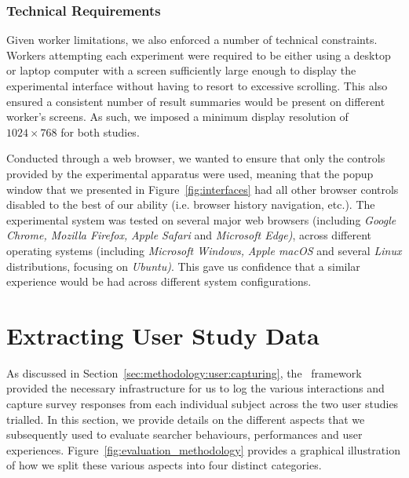 \subsubsection{Technical Requirements}\label{sec:methodology:user:crowdsourcing:technical}
Given worker limitations, we also enforced a number of technical constraints. Workers attempting each experiment were required to be either using a desktop or laptop computer with a screen sufficiently large enough to display the experimental interface without having to resort to excessive scrolling. This also ensured a consistent number of result summaries would be present on different worker's screens. As such, we imposed a minimum display resolution of $1024 \times 768$ for both studies. 

Conducted through a web browser, we wanted to ensure that only the controls provided by the experimental apparatus were used, meaning that the popup window that we presented in Figure~\ref{fig:interfaces} had all other browser controls disabled to the best of our ability (i.e. browser history navigation, etc.). The experimental system was tested on several major web browsers (including \emph{Google Chrome, Mozilla Firefox,} \emph{Apple Safari} and \emph{Microsoft Edge)}, across different operating systems (including \emph{Microsoft Windows,} \emph{Apple macOS} and several \emph{Linux} distributions, focusing on \emph{Ubuntu)}. This gave us confidence that a similar experience would be had across different system configurations.

\section{Extracting User Study Data}\label{sec:methodology:extracting}
As discussed in Section~\ref{sec:methodology:user:capturing}, the \treconomics~framework provided the necessary infrastructure for us to log the various interactions and capture survey responses from each individual subject across the two user studies trialled. In this section, we provide details on the different aspects that we subsequently used to evaluate searcher behaviours, performances and user experiences. Figure~\ref{fig:evaluation_methodology} provides a graphical illustration of how we split these various aspects into four distinct categories.


